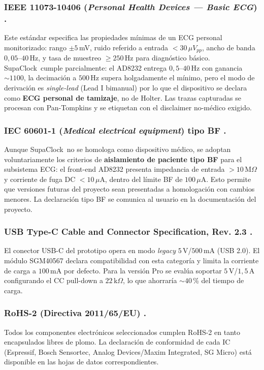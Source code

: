 \documentclass[letterpaper,11pt]{article}
\newcommand{\NombreProyecto}{SupaClock}
\begin{document}
\subsubsection*{IEEE 11073-10406 (\textit{Personal Health Devices --- Basic ECG}) \cite{ieee11073}.}
Este est\'andar especifica las propiedades m\'inimas de un ECG personal monitorizado: rango $\pm 5$\,mV, ruido referido a entrada $<30\,\mu V_{pp}$, ancho de banda $0{,}05$--$40$\,Hz, y tasa de muestreo $\geq 250$\,Hz para diagn\'ostico b\'asico. \NombreProyecto\ cumple parcialmente: el AD8232 entrega $0{,}5$--$40$\,Hz con ganancia $\sim 1100$, la decimaci\'on a $500$\,Hz supera holgadamente el m\'inimo, pero el modo de derivaci\'on es \textit{single-lead} (Lead I bimanual) por lo que el dispositivo se declara como \textbf{ECG personal de tamizaje}, no de Holter. Las trazas capturadas se procesan con Pan-Tompkins \cite{pan_tompkins} y se etiquetan con el disclaimer no-m\'edico exigido.

\subsubsection*{IEC 60601-1 (\textit{Medical electrical equipment}) tipo BF \cite{iec60601}.}
Aunque \NombreProyecto\ no se homologa como dispositivo m\'edico, se adoptan voluntariamente los criterios de \textbf{aislamiento de paciente tipo BF} para el subsistema ECG: el front-end AD8232 presenta impedancia de entrada $>10\,\text{M}\Omega$ y corriente de fuga DC $<10\,\mu$A, dentro del l\'imite BF de $100\,\mu$A. Esto permite que versiones futuras del proyecto sean presentadas a homologaci\'on con cambios menores. La declaraci\'on tipo BF se comunica al usuario en la documentaci\'on del proyecto.

\subsubsection*{USB Type-C Cable and Connector Specification, Rev. 2.3 \cite{usbpd}.}
El conector USB-C del prototipo opera en modo \textit{legacy} $5$\,V/$500$\,mA (USB 2.0). El m\'odulo SGM40567 declara compatibilidad con esta categor\'ia y limita la corriente de carga a $100$\,mA por defecto. Para la versi\'on Pro se eval\'ua soportar $5$\,V/$1{,}5$\,A configurando el CC pull-down a $22\,\text{k}\Omega$, lo que ahorrar\'ia $\sim 40$\,\% del tiempo de carga.

\subsubsection*{RoHS-2 (Directiva 2011/65/EU) \cite{rohs}.}
Todos los componentes electr\'onicos seleccionados cumplen RoHS-2 en tanto encapsulados libres de plomo. La declaraci\'on de conformidad de cada IC (Espressif, Bosch Sensortec, Analog Devices/Maxim Integrated, SG Micro) est\'a disponible en las hojas de datos correspondientes.
\end{document}
